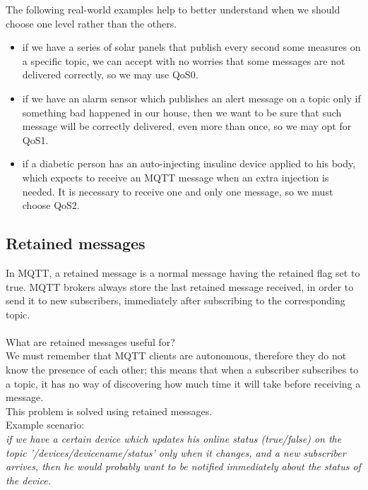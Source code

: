 \documentclass[12pt]{report}
\begin{document}
{\setlength{\parindent}{0cm} {The following real-world examples help to better understand when we should choose one level rather than the others.\\
}

\begin{itemize}
\setlength{\itemindent}{+4mm}
\item if we have a series of solar panels that publish every second some measures on a specific topic, we can accept with no worries that some messages are not delivered correctly, so we may use QoS0.
\item if we have an alarm sensor which publishes an alert message on a topic only if something bad happened in our house, then we want to be sure that such message will be correctly delivered, even more than once, so we may opt for QoS1.
\item if a diabetic person has an auto-injecting insuline device applied to his body, which expects to receive an MQTT message when an extra injection is needed. It is necessary to receive one and only one message, so we must choose QoS2.
\end{itemize}

\bigskip
\subsection{Retained messages}
\label{ssec:retainedmessages}
\bigskip
In MQTT, a retained message is a normal message having the retained flag set to true.
MQTT brokers always store the last retained message received, in order to send it to new subscribers, immediately after subscribing to the corresponding topic.\\\\
What are retained messages useful for?\\

We must remember that MQTT clients are autonomous, therefore they do not know the presence of each other; this means that when a subscriber subscribes to a topic, it has no way of discovering how much time it will take before receiving a message.\\
This problem is solved using retained messages.\\

Example scenario: \\

\emph{if we have a certain device which updates his online status (true/false) on the topic '/devices/devicename/status' only when it changes, and a new subscriber arrives, then he would probably want to be notified immediately about the status of the device.}

}
\end{document}
